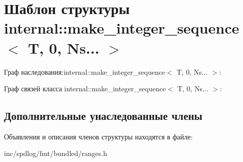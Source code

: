 \hypertarget{structinternal_1_1make__integer__sequence_3_01T_00_010_00_01Ns_8_8_8_01_4}{}\section{Шаблон структуры internal\+:\+:make\+\_\+integer\+\_\+sequence$<$ T, 0, Ns... $>$}
\label{structinternal_1_1make__integer__sequence_3_01T_00_010_00_01Ns_8_8_8_01_4}


Граф наследования\+:internal\+:\+:make\+\_\+integer\+\_\+sequence$<$ T, 0, Ns... $>$\+:


Граф связей класса internal\+:\+:make\+\_\+integer\+\_\+sequence$<$ T, 0, Ns... $>$\+:
\subsection*{Дополнительные унаследованные члены}


Объявления и описания членов структуры находятся в файле\+:\begin{DoxyCompactItemize}
\item 
inc/spdlog/fmt/bundled/ranges.\+h\end{DoxyCompactItemize}
